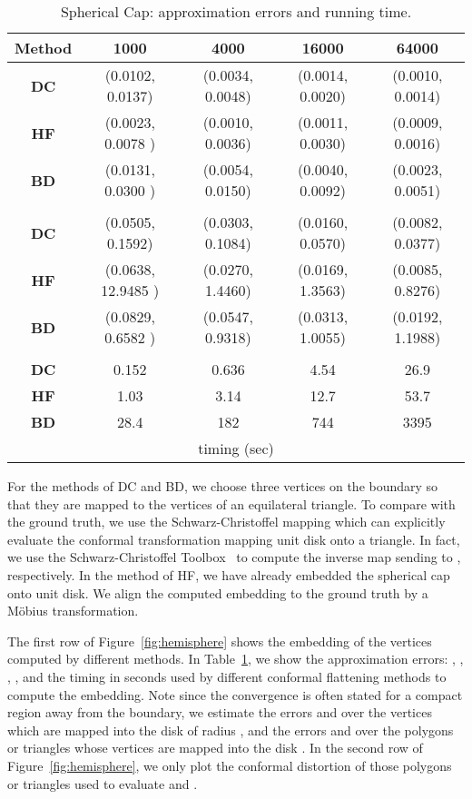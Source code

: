 \documentclass[11pt]{article}
\begin{document}
\begin{table}[!h]
\begin{center}
\begin{tabular}{| c | c | c | c | c |}
\hline
Method  & 1000 &  4000 & 16000 & 64000   \\
\hline
{\bf DC} & (0.0102, 0.0137) & (0.0034, 0.0048) & (0.0014, 0.0020) & (0.0010, 0.0014) \\
\hline
{\bf HF} & (0.0023, 0.0078 ) & (0.0010, 0.0036) & (0.0011, 0.0030) & (0.0009, 0.0016)\\
\hline
{\bf BD}& (0.0131, 0.0300 ) & (0.0054, 0.0150) & (0.0040, 0.0092) & (0.0023, 0.0051)\\
\hline
\multicolumn{5}{|c|}{ } \\
\hline
{\bf DC} & (0.0505, 0.1592) & (0.0303, 0.1084) & (0.0160, 0.0570) & (0.0082, 0.0377) \\
\hline
{\bf HF} & (0.0638, 12.9485 ) & (0.0270, 1.4460) & (0.0169, 1.3563) & (0.0085, 0.8276)\\
\hline
{\bf BD}& (0.0829, 0.6582 ) & (0.0547, 0.9318) & (0.0313, 1.0055) & (0.0192, 1.1988)\\
\hline
\multicolumn{5}{|c|}{ } \\
\hline
{\bf DC} & 0.152 & 0.636 & 4.54 & 26.9 \\
\hline
{\bf HF} &  1.03 & 3.14 & 12.7 & 53.7 \\
\hline
{\bf BD}& 28.4 & 182  & 744 & 3395\\
\hline
\multicolumn{5}{|c|}{ timing (sec)} \\
\hline
\end{tabular}
\end{center}
\vspace{-0.1in}
\caption{Spherical Cap: approximation errors and running time.
\label{tbl:hemisphere}
}
\end{table}


For the methods of DC and BD, we choose three vertices  on the boundary so that they are mapped to 
the vertices of an equilateral triangle. To compare with the ground truth, we use the Schwarz-Christoffel mapping
which can explicitly evaluate the  conformal transformation mapping unit disk onto a triangle. 
In fact, we use the Schwarz-Christoffel Toolbox~\cite{driscoll} to compute the inverse map sending  to 
, respectively. In the method of HF, we have already embedded the spherical
cap onto unit disk. We align the computed embedding to the ground truth by a M\"{o}bius transformation. 


The first row of Figure~\ref{fig:hemisphere} shows the embedding of the vertices computed by different methods. 
In Table~\ref{tbl:hemisphere}, we show the approximation errors: , , , , and 
the timing in seconds used by different conformal flattening methods to compute the embedding. 
Note since the convergence is often stated for a compact region away from the boundary, we estimate the errors
 and  over the vertices which are mapped into the disk  of radius , and the errors
 and  over the polygons or triangles whose vertices are mapped into the disk . 
In the second row of Figure~\ref{fig:hemisphere}, we only plot the conformal distortion of those polygons 
or triangles used to evaluate  and . 
\end{document}
